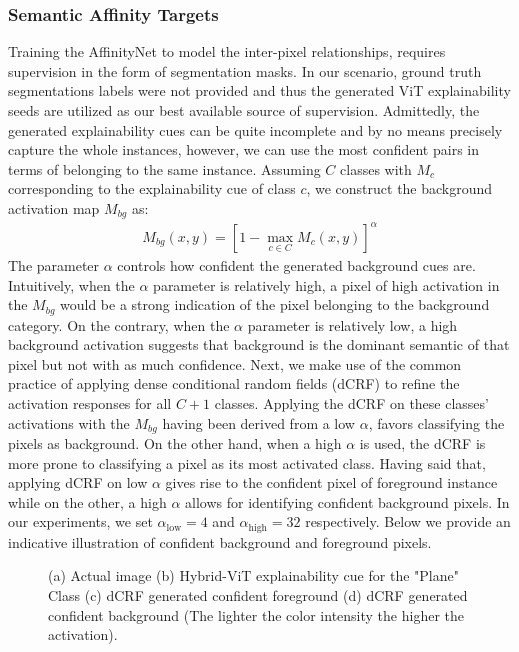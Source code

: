 \documentclass{article}
\begin{document}
\subsubsection{Semantic Affinity Targets}
Training the AffinityNet to model the inter-pixel relationships, requires supervision in the form of segmentation masks. In our scenario, ground truth segmentations labels were not provided and thus the generated ViT explainability seeds are utilized as our best available source of supervision. Admittedly, the generated explainability cues can be quite incomplete and by no means precisely capture the whole instances, however, we can use the most confident pairs in terms of belonging to the same instance. Assuming $C$ classes with $M_{c}$ corresponding to the explainability cue of class $c$, we construct the background activation map $M_{bg}$ as:
\begin{align*}
\label{eq:dropweight}
M_{bg}(x,y) = \left[1 - \max\limits_{c\in C} M_c(x,y)\right]^\alpha
\end{align*}
The parameter $\alpha$ controls how confident the generated background cues are. Intuitively, when the $\alpha$ parameter is relatively high, a pixel of high activation in the $M_{bg}$ would be a strong indication of the pixel belonging to the background category. On the contrary, when the $\alpha$ parameter is relatively low, a high background activation suggests that background is the dominant semantic of that pixel but not with as much confidence. Next, we make use of the common practice of applying dense conditional random fields (dCRF) \cite{krahenbuhl2011efficient} to refine the activation responses for all $C+1$ classes. Applying the dCRF on these classes' activations with the $M_{bg}$ having been derived from a low $\alpha$, favors classifying the pixels as background. On the other hand, when a high $\alpha$ is used, the dCRF is more prone to classifying a pixel as its most activated class. Having said that, applying dCRF on low $\alpha$ gives rise to the confident pixel of foreground instance while on the other, a high $\alpha$ allows for identifying confident background pixels. In our experiments, we set $\alpha_\text{low} = 4$ and $\alpha_\text{high} = 32$ respectively. Below we provide an indicative illustration of confident background and foreground pixels. 

\begin{figure}[H]
    \centering
    \caption{(a) Actual image (b) Hybrid-ViT explainability cue for the "Plane" Class (c) dCRF generated confident foreground (d) dCRF generated confident background (The lighter the color intensity the higher the activation).}
    \label{fig:fig1}
\end{figure}
\end{document}
